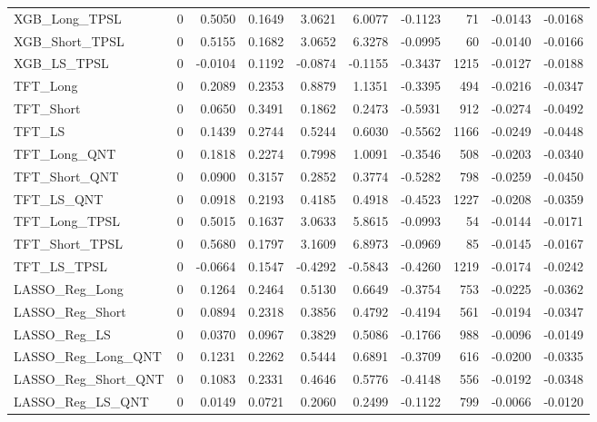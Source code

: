 \begin{tabular}{llrrrrrrrr}
\cline{1-10}
XGB\_Long\_TPSL & 0 & 0.5050 & 0.1649 & 3.0621 & 6.0077 & -0.1123 & 71 & -0.0143 & -0.0168 \\
\cline{1-10}
XGB\_Short\_TPSL & 0 & 0.5155 & 0.1682 & 3.0652 & 6.3278 & -0.0995 & 60 & -0.0140 & -0.0166 \\
\cline{1-10}
XGB\_LS\_TPSL & 0 & -0.0104 & 0.1192 & -0.0874 & -0.1155 & -0.3437 & 1215 & -0.0127 & -0.0188 \\
\cline{1-10}
TFT\_Long & 0 & 0.2089 & 0.2353 & 0.8879 & 1.1351 & -0.3395 & 494 & -0.0216 & -0.0347 \\
\cline{1-10}
TFT\_Short & 0 & 0.0650 & 0.3491 & 0.1862 & 0.2473 & -0.5931 & 912 & -0.0274 & -0.0492 \\
\cline{1-10}
TFT\_LS & 0 & 0.1439 & 0.2744 & 0.5244 & 0.6030 & -0.5562 & 1166 & -0.0249 & -0.0448 \\
\cline{1-10}
TFT\_Long\_QNT & 0 & 0.1818 & 0.2274 & 0.7998 & 1.0091 & -0.3546 & 508 & -0.0203 & -0.0340 \\
\cline{1-10}
TFT\_Short\_QNT & 0 & 0.0900 & 0.3157 & 0.2852 & 0.3774 & -0.5282 & 798 & -0.0259 & -0.0450 \\
\cline{1-10}
TFT\_LS\_QNT & 0 & 0.0918 & 0.2193 & 0.4185 & 0.4918 & -0.4523 & 1227 & -0.0208 & -0.0359 \\
\cline{1-10}
TFT\_Long\_TPSL & 0 & 0.5015 & 0.1637 & 3.0633 & 5.8615 & -0.0993 & 54 & -0.0144 & -0.0171 \\
\cline{1-10}
TFT\_Short\_TPSL & 0 & 0.5680 & 0.1797 & 3.1609 & 6.8973 & -0.0969 & 85 & -0.0145 & -0.0167 \\
\cline{1-10}
TFT\_LS\_TPSL & 0 & -0.0664 & 0.1547 & -0.4292 & -0.5843 & -0.4260 & 1219 & -0.0174 & -0.0242 \\
\cline{1-10}
LASSO\_Reg\_Long & 0 & 0.1264 & 0.2464 & 0.5130 & 0.6649 & -0.3754 & 753 & -0.0225 & -0.0362 \\
\cline{1-10}
LASSO\_Reg\_Short & 0 & 0.0894 & 0.2318 & 0.3856 & 0.4792 & -0.4194 & 561 & -0.0194 & -0.0347 \\
\cline{1-10}
LASSO\_Reg\_LS & 0 & 0.0370 & 0.0967 & 0.3829 & 0.5086 & -0.1766 & 988 & -0.0096 & -0.0149 \\
\cline{1-10}
LASSO\_Reg\_Long\_QNT & 0 & 0.1231 & 0.2262 & 0.5444 & 0.6891 & -0.3709 & 616 & -0.0200 & -0.0335 \\
\cline{1-10}
LASSO\_Reg\_Short\_QNT & 0 & 0.1083 & 0.2331 & 0.4646 & 0.5776 & -0.4148 & 556 & -0.0192 & -0.0348 \\
\cline{1-10}
LASSO\_Reg\_LS\_QNT & 0 & 0.0149 & 0.0721 & 0.2060 & 0.2499 & -0.1122 & 799 & -0.0066 & -0.0120 \\

\end{tabular}
